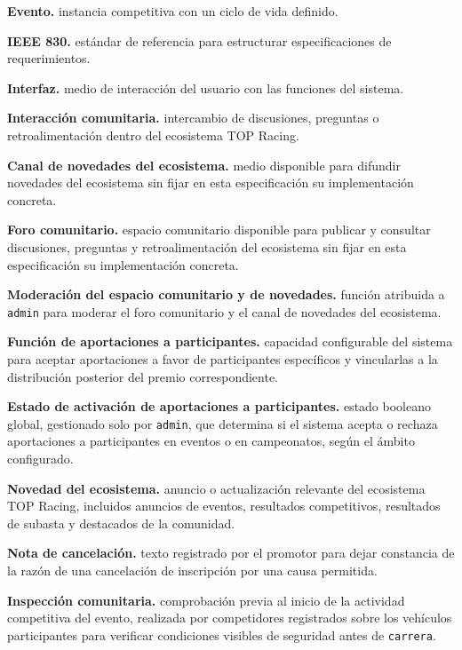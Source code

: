 \documentclass[10pt,letterpaper]{article}
\begin{document}
\noindent\textbf{Evento.} instancia competitiva con un ciclo de vida definido.\par
\noindent\textbf{IEEE 830.} estándar de referencia para estructurar especificaciones de requerimientos.\par
\noindent\textbf{Interfaz.} medio de interacción del usuario con las funciones del sistema.\par
\noindent\textbf{Interacción comunitaria.} intercambio de discusiones, preguntas o retroalimentación dentro del ecosistema TOP Racing.\par
\noindent\textbf{Canal de novedades del ecosistema.} medio disponible para difundir novedades del ecosistema sin fijar en esta especificación su implementación concreta.\par
\noindent\textbf{Foro comunitario.} espacio comunitario disponible para publicar y consultar discusiones, preguntas y retroalimentación del ecosistema sin fijar en esta especificación su implementación concreta.\par
\noindent\textbf{Moderación del espacio comunitario y de novedades.} función atribuida a \texttt{admin} para moderar el foro comunitario y el canal de novedades del ecosistema.\par
\noindent\textbf{Función de aportaciones a participantes.} capacidad configurable del sistema para aceptar aportaciones a favor de participantes específicos y vincularlas a la distribución posterior del premio correspondiente.\par
\noindent\textbf{Estado de activación de aportaciones a participantes.} estado booleano global, gestionado solo por \texttt{admin}, que determina si el sistema acepta o rechaza aportaciones a participantes en eventos o en campeonatos, según el ámbito configurado.\par
\noindent\textbf{Novedad del ecosistema.} anuncio o actualización relevante del ecosistema TOP Racing, incluidos anuncios de eventos, resultados competitivos, resultados de subasta y destacados de la comunidad.\par
\noindent\textbf{Nota de cancelación.} texto registrado por el promotor para dejar constancia de la razón de una cancelación de inscripción por una causa permitida.\par
\noindent\textbf{Inspección comunitaria.} comprobación previa al inicio de la actividad competitiva del evento, realizada por competidores registrados sobre los vehículos participantes para verificar condiciones visibles de seguridad antes de \texttt{carrera}.\par
\end{document}
